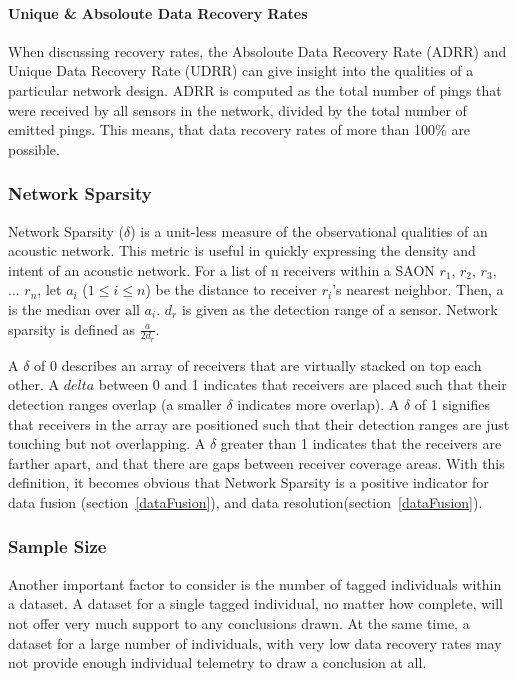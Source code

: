 \paragraph{Unique & Absoloute Data Recovery Rates}
When discussing recovery rates, the Absoloute Data Recovery Rate (ADRR) and Unique Data Recovery Rate (UDRR) can give insight into the qualities of a particular network design.  ADRR is computed as the total number of pings that were received by all sensors in the network, divided by the total number of emitted pings.  This means, that data recovery rates of more than 100$\%$ are possible.  

\subsubsection{Network Sparsity}
\label{delta}
Network Sparsity ($\delta$) is a unit-less measure of the observational qualities of an acoustic network.  This metric is useful in quickly expressing the density and intent of an acoustic network.  For a list of n receivers within a SAON $r_1$, $r_2$, $r_3$, ... $r_n$, let $a_i$ ($1\le i \le n$) be the distance to receiver $r_i$'s nearest neighbor.  Then, a is the median over all $a_i$.  $d_r$ is given as the detection range of a sensor.  Network sparsity is defined as $\frac{a}{2d_r}$.  

A $\delta$ of 0 describes an array of receivers that are virtually stacked on top each other.  A $delta$ between 0 and 1 indicates that receivers are placed such that their detection ranges overlap (a smaller $\delta$ indicates more overlap).  A $\delta$ of 1 signifies that receivers in the array are positioned such that their detection ranges are just touching but not overlapping.  A $\delta$ greater than 1 indicates that the receivers are farther apart, and that there are gaps between receiver coverage areas.  
With this definition, it becomes obvious that Network Sparsity is a positive indicator for data
fusion (section~\ref{dataFusion}), and data resolution(section~\ref{dataFusion}).


\subsubsection{Sample Size}
\label{sampleSize}
Another important factor to consider is the number of tagged individuals within a dataset.  A dataset for a single tagged individual, no matter how complete, will not offer very much support to any conclusions drawn.  At the same time, a dataset for a large number of individuals, with very low data recovery rates may not provide enough individual telemetry to draw a conclusion at all.

